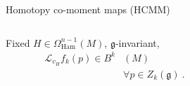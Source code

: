 \documentclass[final,a0paper,20pt,
						pdftex,
            pdfauthor={Antonio Michele Miti},
            pdftitle={Homotopy title},
            pdfsubject={Poster for the conference Super19 in Luxembourg},
            pdfkeywords={Some Keywords},
            pdfproducer={Latex with hyperref, or other system},
            pdfcreator={pdflatex, or other tool}
            ]{beamer}
\newcommand{\pinned}[1]{
    \faThumbTack 
    \hfill
    #1
    \hfill \faThumbTack
    \\
    }
\begin{document}
\begin{frame}[t]
\begin{columns}[t]
\begin{column}{\onecolwid}
\begin{block}{\pinned{Homotopy co-moment maps (HCMM)}}
\begin{columns}
\begin{column}{.375\textwidth}
\begin{propblock}
					Fixed $H\in \Omega^{n-1}_{\text{Ham}}(M)$, $\mathfrak{g}$-invariant,
					\begin{displaymath}
					\begin{split}
						\mathcal{L}_{v_H} f_k(p) \in B^k&(M) \\
						& \forall p \in Z_k(\mathfrak{g}) ~.
					\end{split}
					\end{displaymath}
				\end{propblock}
			\end{column}
		\end{columns}
	\end{block}




\end{column}


\begin{column}{\sepwidinternal}\end{column} %


\begin{column}{\onecolwid}


\end{column}
\end{columns}
\end{frame}
\end{document}
